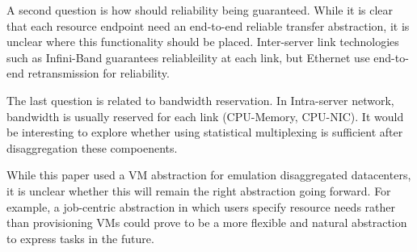 A second question is how should reliability being guaranteed. 
While it is clear that each resource endpoint need an end-to-end reliable transfer abstraction, it is unclear where this functionality should be placed.
Inter-server link technologies such as Infini-Band guarantees reliableility at each link, but Ethernet use end-to-end retransmission for reliability. 

The last question is related to bandwidth reservation. In Intra-server network, bandwidth is usually reserved for each link (CPU-Memory, CPU-NIC). 
It would be interesting to explore whether using statistical multiplexing is sufficient after disaggregation these compoenents.




While this paper used a VM abstraction for emulation disaggregated datacenters, it is unclear whether this will remain the right abstraction going forward. For example, a job-centric abstraction in which users specify resource needs rather than provisioning VMs could prove to be a more flexible and natural abstraction to express tasks in the future.




